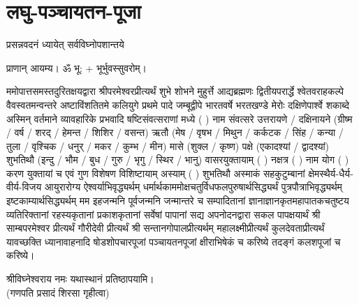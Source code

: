 
\setlength{\parindent}{0pt}
\chapter{लघु-पञ्चायतन-पूजा}




{प्रसन्नवदनं ध्यायेत् सर्वविघ्नोपशान्तये}

प्राणान् आयम्य। ॐ भू: + भूर्भुवस्सुवरोम्।


ममोपात्तसमस्तदुरितक्षयद्वारा श्रीपरमेश्वरप्रीत्यर्थं शुभे शोभने मुहुर्त्ते आद्यब्रह्मणः
द्वितीयपरार्द्धे श्वेतवराहकल्पे वैवस्वतमन्वन्तरे अष्टाविंशतितमे कलियुगे प्रथमे पादे
जम्बूद्वीपे भारतवर्षे भरतखण्डे मेरोः दक्षिणेपार्श्वे शकाब्दे अस्मिन् वर्तमाने व्यावहारिके
प्रभवादि षष्टिसंवत्सराणां मध्ये (	) नाम संवत्सरे उत्तरायणे / दक्षिनायने 
(ग्रीष्म / वर्ष / शरद् / हेमन्त / शिशिर / वसन्त) ऋतौ (मेष / वृषभ / मिथुन / कर्कटक / सिंह / कन्या / तुला / 
वृश्चिक / धनुर् / मकर / कुम्भ / मीन) मासे (शुक्ल / कृष्ण) पक्षे (एकादश्यां / द्वादश्यां) शुभतिथौ
(इन्दु / भौम / बुध / गुरु / भृगु / स्थिर / भानु) वासरयुक्तायाम्
( ) नक्षत्र ( ) नाम योग ( ) करण युक्तायां च एवं गुण विशेषण विशिष्टायाम्
अस्याम् ( ) शुभतिथौ 
अस्माकं सहकुटुम्बानां क्षेमस्थैर्य-धैर्य-वीर्य-विजय आयुरारोग्य ऐश्वर्याभिवृद्ध्यर्थम्
धर्मार्थकाममोक्ष\-चतुर्विधफलपुरुषार्थसिद्ध्यर्थं पुत्रपौत्राभि\-वृद्ध्यर्थम् इष्टकाम्यार्थसिद्ध्यर्थम्
मम इहजन्मनि पूर्वजन्मनि जन्मान्तरे च सम्पादितानां ज्ञानाज्ञानकृतमहा\-पातकचतुष्टय
व्यतिरिक्तानां रहस्यकृतानां प्रकाशकृतानां सर्वेषां पापानां सद्य अपनोदनद्वारा सकल 
पापक्षयार्थं श्री साम्बपरमेश्वर प्रीत्यर्थं गौरीदेवी प्रीत्यर्थं श्री सन्तानगोपालप्रीत्यर्थम् महालक्ष्मीप्रीत्यर्थं कुलदेवताप्रीत्यर्थं यावच्छक्ति ध्यानावाहनादि षोडशोपचारपूजां 
पञ्चायतनपूजां क्षीराभिषेकं च करिष्ये
तदङ्गं कलशपूजां च करिष्ये।


श्रीविघ्नेश्वराय नमः यथास्थानं प्रतिष्ठापयामि।\\
(गणपति प्रसादं शिरसा गृहीत्वा)









